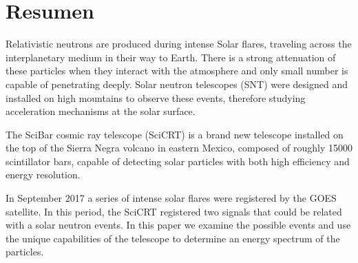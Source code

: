 \chapter{Resumen}

Relativistic neutrons are produced during intense Solar flares, traveling across the interplanetary medium in their way to Earth. There is a strong attenuation of these particles when they interact with the atmosphere and only small number is capable of penetrating deeply. Solar neutron telescopes (SNT) were designed and installed on high mountains to observe these events, therefore studying acceleration mechanisms at the solar surface.

The SciBar cosmic ray telescope (SciCRT) is a brand new telescope installed on the top of the Sierra Negra volcano in eastern Mexico, composed of roughly \num{15000} scintillator bars, capable of detecting solar particles with both high efficiency and energy resolution. 


In September \num{2017} a series of intense solar flares were registered by the GOES satellite. In this period, the SciCRT registered two signals that could be related with a solar neutron events. In this paper we examine the possible events and use the unique capabilities of the telescope to determine an energy
spectrum of the particles.
